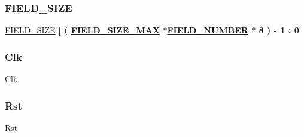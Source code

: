\subsubsection{\texorpdfstring{F\+I\+E\+L\+D\+\_\+\+S\+I\+ZE}{FIELD\_SIZE}}
{\footnotesize\ttfamily \mbox{\hyperlink{enumpacket__parser__top__tb_aed76c3233df9cc658acb293145ac9acf}{F\+I\+E\+L\+D\+\_\+\+S\+I\+ZE}} {\bfseries \textcolor{vhdlchar}{\mbox{[}}\textcolor{vhdlchar}{ }\textcolor{vhdlchar}{(}\textcolor{vhdlchar}{ }{\bfseries \mbox{\hyperlink{enumpacket__parser__top__tb_ae35d6a8982056bf50516d906dbb9e03a}{F\+I\+E\+L\+D\+\_\+\+S\+I\+Z\+E\+\_\+\+M\+AX}}} \textcolor{vhdlchar}{ }\textcolor{vhdlchar}{$\ast$}{\bfseries \mbox{\hyperlink{enumpacket__parser__top__tb_a677494ad5b2330357e320a2cf124446d}{F\+I\+E\+L\+D\+\_\+\+N\+U\+M\+B\+ER}}} \textcolor{vhdlchar}{ }\textcolor{vhdlchar}{$\ast$} \textcolor{vhdldigit}{8} \textcolor{vhdlchar}{ }\textcolor{vhdlchar}{)}\textcolor{vhdlchar}{ }\textcolor{vhdlchar}{ }\textcolor{vhdlchar}{-\/} \textcolor{vhdldigit}{1} \textcolor{vhdlchar}{ }\textcolor{vhdlchar}{\+:}\textcolor{vhdlchar}{ } \textcolor{vhdldigit}{0} \textcolor{vhdlchar}{ }} \hspace{0.3cm}}

\mbox{\label{enumpacket__parser__top__tb_a1af6e678e75aaa480ebe640a45e498fa}} 
\subsubsection{\texorpdfstring{Clk}{Clk}}
{\footnotesize\ttfamily \mbox{\hyperlink{enumpacket__parser__top__tb_a1af6e678e75aaa480ebe640a45e498fa}{Clk}} {\bfseries \textcolor{vhdlchar}{ }} \hspace{0.3cm}}

\mbox{\label{enumpacket__parser__top__tb_a369a0a6fe6b71f3bf0fc3cd81147ea25}} 
\subsubsection{\texorpdfstring{Rst}{Rst}}
{\footnotesize\ttfamily \mbox{\hyperlink{enumpacket__parser__top__tb_a369a0a6fe6b71f3bf0fc3cd81147ea25}{Rst}} {\bfseries \textcolor{vhdlchar}{ }} \hspace{0.3cm}}

